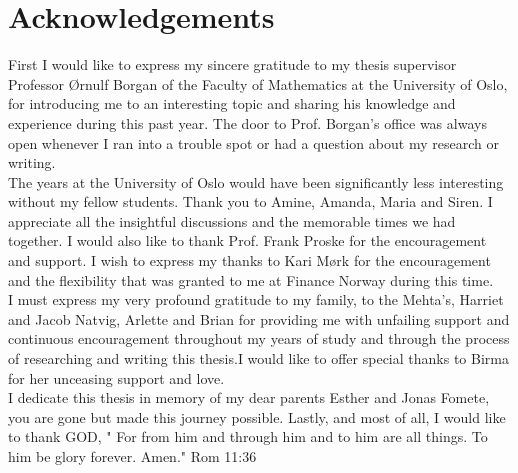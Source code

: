 \chapter{Acknowledgements}


First I would like to express my sincere gratitude to my thesis supervisor Professor Ørnulf Borgan of the Faculty of Mathematics at the University of Oslo, for introducing me to an interesting topic and sharing his knowledge and experience during this past year. The door to Prof. Borgan's office was always open whenever I ran into a trouble spot or had a question about my research or writing.\\

The years at the University of Oslo would have been significantly less interesting without my fellow students. Thank you to Amine, Amanda, Maria and Siren. I appreciate all the insightful discussions and the memorable times we had together. I would also like to thank Prof. Frank Proske for the encouragement and support.
I wish to express my thanks to Kari Mørk for the encouragement and the flexibility that was granted to me at Finance Norway during this time.\\

I must express my very profound gratitude to my family, to the Mehta's, Harriet and Jacob Natvig, Arlette and  Brian for providing me with unfailing support and continuous encouragement throughout my years of study and through the process of researching and writing this thesis.I would like to offer special thanks to Birma for her unceasing support and love.\\

I dedicate this thesis in memory of my dear parents Esther and Jonas Fomete, you are gone but made this journey possible. Lastly, and most of all, I would like to thank GOD, " For from him and through him and to him are all things. To him be glory forever. Amen." Rom 11:36 



 
